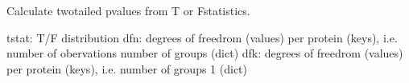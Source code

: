 \documentclass[letterpaper,10pt,english]{sphinxmanual}
\begin{document}

\begin{fulllineitems}
\label{\detokenize{_autosummary/analytics_core.analytics:analytics_core.analytics.analytics.calculate_pvalue_from_tstats}}
Calculate two\sphinxhyphen{}tailed p\sphinxhyphen{}values from T\sphinxhyphen{} or F\sphinxhyphen{}statistics.

tstat: T/F distribution
dfn: degrees of freedrom  (values) per protein (keys), i.e. number of obervations \sphinxhyphen{} number of groups (dict)
dfk: degrees of freedrom  (values) per protein (keys), i.e. number of groups \sphinxhyphen{} 1 (dict)

\end{fulllineitems}

\end{document}
